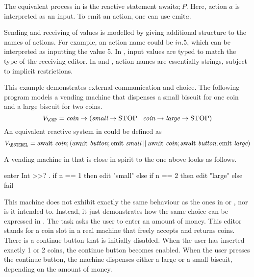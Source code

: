 The equivalent process in \ESTEREL is the reactive statement $\text{await} a; P$.
Here, action $a$ is interpreted as an input.
To emit an action, one can use $\text{emit} a$.

Sending and receiving of values is modelled by giving additional structure to the names of actions.
For example, an action name could be $\textit{in}.5$, which can be interpreted as inputting the value 5.
%
In \TOP, input values are typed to match the type of the receiving editor.
In \CSP and \ESTEREL, action names are essentially strings, subject to implicit restrictions.



\begin{example}

This example demonstrates external communication and choice.
The following \CSP program models a vending machine that dispenses a small biscuit for one coin and a large biscuit for two coins.
\begin{equation*}
  V_\text{\CSP} = \textit{coin} \to (\textit{small} \to \text{STOP} \mid \textit{coin} \to \textit{large} \to \text{STOP})
\end{equation*}
An equivalent reactive system in \ESTEREL could be defined as
\begin{equation*}
  V_\text{\ESTEREL} = \text{await } \textit{coin}; ( \text{await } \textit{button}; \text{emit } \textit{small} \parallel \text{await } \textit{coin}; \text{await } \textit{button}; \text{emit } \textit{large})
\end{equation*}

A vending machine in \TOPHAT that is close in spirit to the one above looks as follows.
\begin{TASK}
  enter Int >>? \n. if n == 1 then edit "small" else if n == 2 then edit "large" else fail
\end{TASK}
This machine does not exhibit exactly the same behaviour as the ones in \CSP or \ESTEREL, nor is it intended to.
Instead, it just demonstrates how the same choice
can be expressed in \TOPHAT.
The task asks the user to enter an amount of money.
This editor stands for a coin slot in a real machine that freely accepts and returns coins.
There is a continue button that is initially disabled.
When the user has inserted exactly 1 or 2 coins, the continue button becomes enabled.
When the user presses the continue button, the machine dispenses either a large or a small biscuit, depending on the amount of money.

\end{example}



